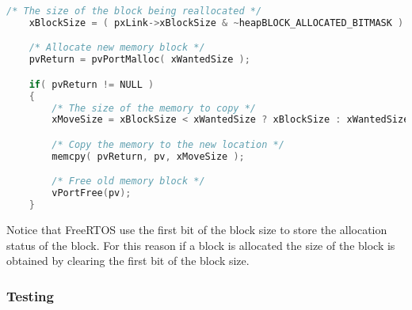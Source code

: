     \begin{codebox}
    \begin{lstlisting}[language=c]
    /* The size of the block being reallocated */
    xBlockSize = ( pxLink->xBlockSize & ~heapBLOCK_ALLOCATED_BITMASK ) - xHeapStructSize;

    /* Allocate new memory block */
    pvReturn = pvPortMalloc( xWantedSize );

    if( pvReturn != NULL )
    {
        /* The size of the memory to copy */
        xMoveSize = xBlockSize < xWantedSize ? xBlockSize : xWantedSize;

        /* Copy the memory to the new location */
        memcpy( pvReturn, pv, xMoveSize );

        /* Free old memory block */
        vPortFree(pv);
    } 
    \end{lstlisting}
    \end{codebox}

    Notice that FreeRTOS use the first bit of the block size to store the allocation status of the block. For this reason if a block is allocated the size of the block is obtained by clearing the first bit of the block size.

    \subsubsection{Testing}